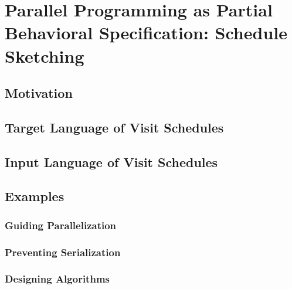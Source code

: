 \chapter{Parallel Programming as Partial Behavioral Specification: Schedule Sketching}
\section{Motivation}
\section{Target Language of Visit Schedules}
\section{Input Language of Visit Schedules}
\section{Examples}
\subsection{Guiding Parallelization}
\subsection{Preventing Serialization}
\subsection{Designing Algorithms}